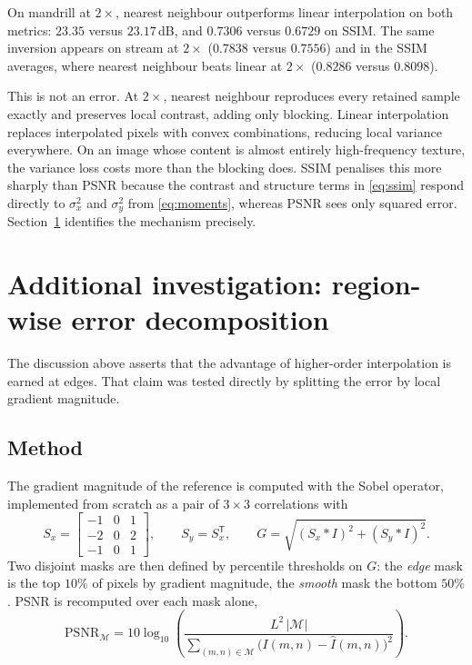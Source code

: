 \documentclass[11pt,a4paper]{article}
\begin{document}
On mandrill at $2\times$, nearest neighbour outperforms linear interpolation on both metrics:
$23.35$ versus $23.17$\,dB, and $0.7306$ versus $0.6729$ on SSIM. The same inversion appears
on stream at $2\times$ ($0.7838$ versus $0.7556$) and in the SSIM averages, where nearest
neighbour beats linear at $2\times$ ($0.8286$ versus $0.8098$).

This is not an error. At $2\times$, nearest neighbour reproduces every retained sample exactly
and preserves local contrast, adding only blocking. Linear interpolation replaces interpolated
pixels with convex combinations, reducing local variance everywhere. On an image whose content
is almost entirely high-frequency texture, the variance loss costs more than the blocking
does. SSIM penalises this more sharply than PSNR because the contrast and structure terms in
\eqref{eq:ssim} respond directly to $\sigma_{x}^{2}$ and $\sigma_{y}^{2}$ from
\eqref{eq:moments}, whereas PSNR sees only squared error. Section~\ref{sec:regions} identifies
the mechanism precisely.

\section{Additional investigation: region-wise error decomposition}
\label{sec:regions}

The discussion above asserts that the advantage of higher-order interpolation is earned at
edges. That claim was tested directly by splitting the error by local gradient magnitude.

\subsection{Method}

The gradient magnitude of the reference is computed with the Sobel operator, implemented from
scratch as a pair of $3\times3$ correlations with
\begin{equation}
S_{x} = \begin{bmatrix} -1 & 0 & 1 \\ -2 & 0 & 2 \\ -1 & 0 & 1 \end{bmatrix},
\qquad
S_{y} = S_{x}^{\mathsf{T}},
\qquad
G = \sqrt{(S_{x} * I)^{2} + (S_{y} * I)^{2}} .
\label{eq:sobel}
\end{equation}
Two disjoint masks are then defined by percentile thresholds on $G$: the \emph{edge} mask is
the top $10\%$ of pixels by gradient magnitude, the \emph{smooth} mask the bottom $50\%$. PSNR
is recomputed over each mask alone,
\begin{equation}
\mathrm{PSNR}_{\mathcal{M}} = 10\log_{10}\!\left(
\frac{L^{2}\,|\mathcal{M}|}{\sum_{(m,n) \in \mathcal{M}} \big(I(m,n)-\hat{I}(m,n)\big)^{2}}
\right).
\label{eq:maskedpsnr}
\end{equation}
\end{document}

